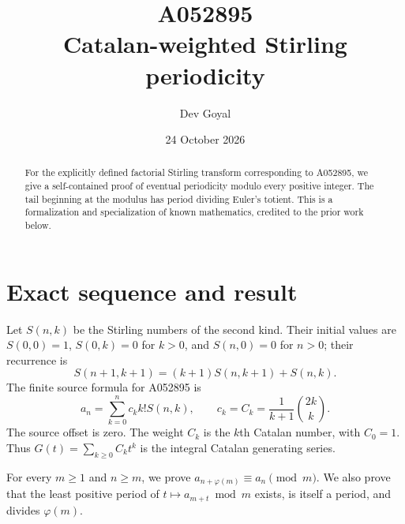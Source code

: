 \documentclass[11pt,a4paper]{article}
\title{A052895\\[3pt]Catalan-weighted Stirling periodicity}
\author{Dev Goyal}
\date{24 October 2026}
\theoremstyle{remark}
\begin{document}
\maketitle
\begin{center}
\end{center}
\begin{abstract}
For the explicitly defined factorial Stirling transform corresponding to A052895, we give a self-contained proof of eventual periodicity modulo every positive integer. The tail beginning at the modulus has period dividing Euler's totient. This is a formalization and specialization of known mathematics, credited to the prior work below.
\end{abstract}
\section{Exact sequence and result}
Let $S(n,k)$ be the Stirling numbers of the second kind. Their initial
values are $S(0,0)=1$, $S(0,k)=0$ for $k>0$, and $S(n,0)=0$ for
$n>0$; their recurrence is
\[
S(n+1,k+1)=(k+1)S(n,k+1)+S(n,k).
\]
The finite source formula for A052895 \cite{oeis} is
\[
a_n=\sum_{k=0}^n c_k k!S(n,k),\qquad c_k=C_k=\frac{1}{k+1}\binom{2k}{k}.
\]
The source offset is zero. The weight $C_k$ is the $k$th Catalan number, with $C_0=1$. Thus $G(t)=\sum_{k\ge0}C_kt^k$ is the integral Catalan generating series.

For every $m\ge1$ and $n\ge m$, we prove
$a_{n+\varphi(m)}\equiv a_n\pmod m$. We also prove that the least
positive period of $t\mapsto a_{m+t}\bmod m$ exists, is itself a
period, and divides $\varphi(m)$.
\end{document}
